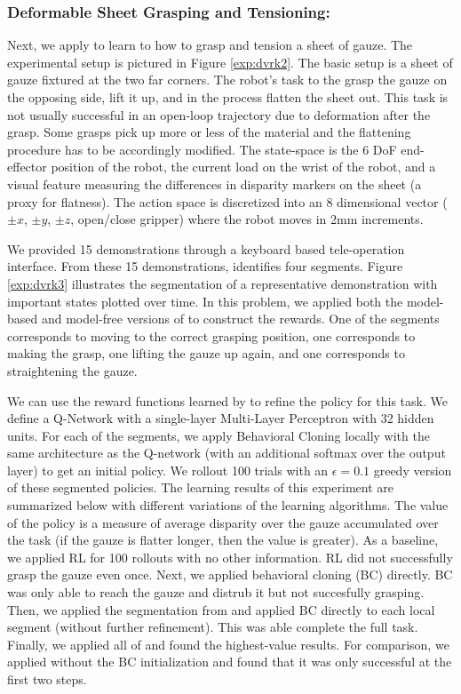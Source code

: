 \subsubsection{Deformable Sheet Grasping and Tensioning: } Next, we apply \hirl to learn to how to grasp and tension a sheet of gauze. The experimental setup is pictured in Figure \ref{exp:dvrk2}. The basic setup is a sheet of gauze fixtured at the two far corners. The robot's task to the grasp the gauze on the opposing side, lift it up, and in the process flatten the sheet out.
This task is not usually successful in an open-loop trajectory due to deformation after the grasp.
Some grasps pick up more or less of the material and the flattening procedure has to be accordingly modified.
The state-space is the 6 DoF end-effector position of the robot, the current load on the wrist of the robot, and a visual feature measuring the differences in disparity markers on the sheet (a proxy for flatness).
The action space is discretized into an 8 dimensional vector ($\pm x$, $\pm y$, $\pm z$, open/close gripper) where the robot moves in 2mm increments.

We provided 15 demonstrations through a keyboard based tele-operation interface.
From these 15 demonstrations, \hirl identifies four segments. Figure \ref{exp:dvrk3} illustrates the segmentation of a representative demonstration with important states plotted over time.
In this problem, we applied both the model-based and model-free versions of \hirl to construct the rewards.
One of the segments corresponds to moving to the correct grasping position, one corresponds to making the grasp, one lifting the gauze up again, and one corresponds to straightening the gauze.

We can use the reward functions learned by \hirl to refine the policy for this task.
We define a Q-Network with a single-layer Multi-Layer Perceptron with 32 hidden units.
For each of the segments, we apply Behavioral Cloning locally with the same architecture as the Q-network (with an additional softmax over the output layer) to get an initial policy. We rollout 100 trials with an $\epsilon=0.1$ greedy version of these segmented policies.
The learning results of this experiment are summarized below with different variations of the learning algorithms.
The value of the policy is a measure of average disparity over the gauze accumulated over the task (if the gauze is flatter longer, then the value is greater).
As a baseline, we applied RL for 100 rollouts with no other information. RL did not successfully grasp the gauze even once.
Next, we applied behavioral cloning (BC) directly.
BC was only able to reach the gauze and distrub it but not succesfully grasping.
Then, we applied the segmentation from \hirl  and applied BC directly to each local segment (without further refinement). 
This was able complete the full task.
Finally, we applied all of \hirl and found the highest-value results.
For comparison, we applied \hirl without the BC initialization and found that it was only successful at the first two steps.

